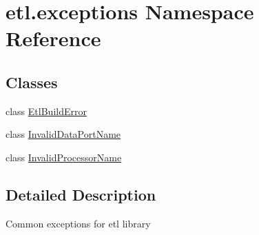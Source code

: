 \hypertarget{namespaceetl_1_1exceptions}{\section{etl.\-exceptions Namespace Reference}
\label{namespaceetl_1_1exceptions}
}
\subsection*{Classes}
\begin{DoxyCompactItemize}
\item 
class \hyperlink{classetl_1_1exceptions_1_1EtlBuildError}{Etl\-Build\-Error}
\item 
class \hyperlink{classetl_1_1exceptions_1_1InvalidDataPortName}{Invalid\-Data\-Port\-Name}
\item 
class \hyperlink{classetl_1_1exceptions_1_1InvalidProcessorName}{Invalid\-Processor\-Name}
\end{DoxyCompactItemize}


\subsection{Detailed Description}
\begin{DoxyVerb}Common exceptions for etl library\end{DoxyVerb}
 